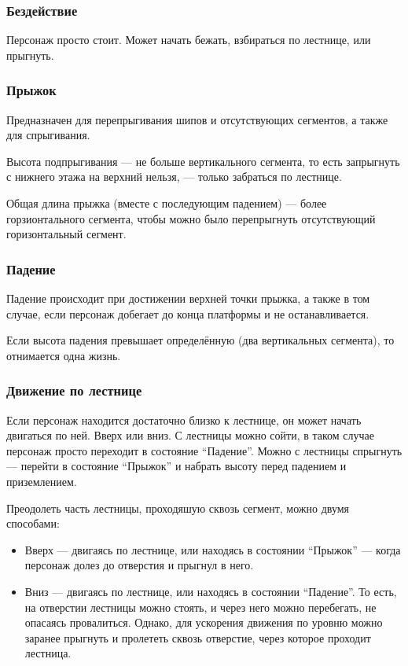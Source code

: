 \documentclass[12pt,a4paper]{article}
\begin{document}
\subsubsection{Бездействие}
Персонаж просто стоит. Может начать бежать, взбираться по лестнице, или прыгнуть.\\

\subsubsection{Прыжок}
Предназначен для перепрыгивания шипов и отсутствующих сегментов, а также для спрыгивания.

Высота подпрыгивания --- не больше вертикального сегмента, то есть запрыгнуть с нижнего этажа на верхний нельзя, --- только забраться по лестнице.

Общая длина прыжка (вместе с последующим падением) --- более горзионтального сегмента, чтобы можно было перепрыгнуть отсутствующий горизонтальный сегмент.\\

\subsubsection{Падение}
Падение происходит при достижении верхней точки прыжка, а также в том случае, если персонаж добегает до конца платформы и не останавливается.

Если высота падения превышает определённую (два вертикальных сегмента), то отнимается одна жизнь.\\

\subsubsection{Движение по лестнице}
Если персонаж находится достаточно близко к лестнице, он может начать двигаться по ней. Вверх или вниз. С лестницы можно сойти, в таком случае персонаж просто переходит в состояние ``Падение''. Можно с лестницы спрыгнуть --- перейти в состояние ``Прыжок'' и набрать высоту перед падением и приземлением.

Преодолеть часть лестницы, проходяшую сквозь сегмент, можно двумя способами:
\begin{itemize}
\item Вверх --- двигаясь по лестнице, или находясь в состоянии ``Прыжок'' --- когда персонаж долез до отверстия и прыгнул в него.
\item Вниз --- двигаясь по лестнице, или находясь в состоянии ``Падение''. То есть, на отверстии лестницы можно стоять, и через него можно перебегать, не опасаясь провалиться. Однако, для ускорения движения по уровню можно заранее прыгнуть и пролететь сквозь отверстие, через которое проходит лестница.\\
\end{itemize}
\end{document}
